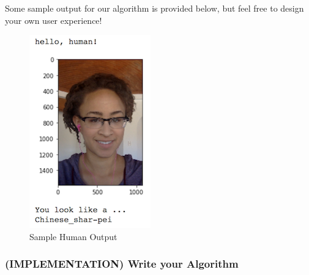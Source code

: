 \documentclass[11pt]{article}
\makeatletter
\def\maxwidth{\ifdim\Gin@nat@width>\linewidth\linewidth
    \else\Gin@nat@width\fi}
\let\Oldincludegraphics\includegraphics
\renewcommand{\includegraphics}[1]{\Oldincludegraphics[width=.8\maxwidth]{#1}}
\makeatother
\begin{document}
Some sample output for our algorithm is provided below, but feel free to
design your own user experience!

\begin{figure}
\centering
\includegraphics{images/sample_human_output.png}
\caption{Sample Human Output}
\end{figure}

\subsubsection{(IMPLEMENTATION) Write your
Algorithm}\label{implementation-write-your-algorithm}
\end{document}
